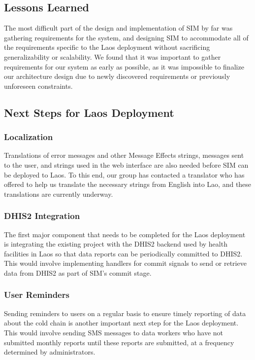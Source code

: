 \documentclass{acm_proc_article-sp}
\begin{document}
\subsection{Lessons Learned}

The most difficult part of the design and implementation of SIM by far was gathering requirements for the system, and designing SIM to accommodate all of the requirements specific to the Laos deployment without sacrificing generalizability or scalability. We found that it was important to gather requirements for our system as early as possible, as it was impossible to finalize our architecture design due to newly discovered requirements or previously unforeseen constraints.

\subsection{Next Steps for Laos Deployment}

\subsubsection{Localization}

Translations of error messages and other Message Effects strings, messages sent to the user, and strings used in the web interface are also needed before SIM can be deployed to Laos. To this end, our group has contacted a translator who has offered to help us translate the necessary strings from English into Lao, and these translations are currently underway.

\subsubsection{DHIS2 Integration}

The first major component that needs to be completed for the Laos deployment is integrating the existing project with the DHIS2 backend used by health facilities in Laos so that data reports can be periodically committed to DHIS2. This would involve implementing handlers for commit signals to send or retrieve data from DHIS2 as part of SIM's commit stage.

\subsubsection{User Reminders}

Sending reminders to users on a regular basis to ensure timely reporting of data about the cold chain is another important next step for the Laos deployment. This would involve sending SMS messages to data workers who have not submitted monthly reports until these reports are submitted, at a frequency determined by administrators. 
\end{document}
